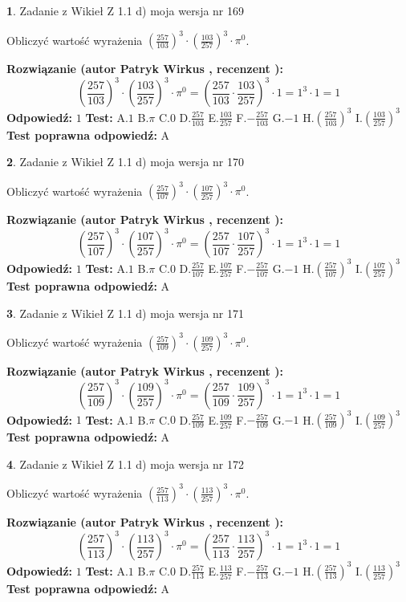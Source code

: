 \documentclass[12pt, a4paper]{article}
\theoremstyle{definition} %
\newtheorem{zad}{}
\newcommand{\zadStart}[1]{\begin{zad}#1\newline}
\newcommand{\zadStop}{\end{zad}}
\newcommand{\rozwStart}[2]{\noindent \textbf{Rozwiązanie (autor #1 , recenzent #2): }\newline}
\newcommand{\rozwStop}{\newline}
\newcommand{\odpStart}{\noindent \textbf{Odpowiedź:}\newline}
\newcommand{\odpStop}{\newline}
\newcommand{\testStart}{\noindent \textbf{Test:}\newline}
\newcommand{\testStop}{\newline}
\newcommand{\kluczStart}{\noindent \textbf{Test poprawna odpowiedź:}\newline}
\newcommand{\kluczStop}{\newline}
\begin{document}
\zadStart{Zadanie z Wikieł Z 1.1 d) moja wersja nr 169}

Obliczyć wartość wyrażenia $(\frac{257}{103})^{3} \cdot (\frac{103}{257})^{3} \cdot \pi^{0}$.
\zadStop
\rozwStart{Patryk Wirkus}{}
$$(\frac{257}{103})^{3} \cdot (\frac{103}{257})^{3} \cdot \pi^{0} = (\frac{257}{103} \cdot \frac{103}{257})^{3} \cdot 1 = 1^{3} \cdot 1 = 1$$
\rozwStop
\odpStart
$1$
\odpStop
\testStart
A.$1$ B.$\pi$ C.$0$ D.$\frac{257}{103}$ E.$\frac{103}{257}$
F.$-\frac{257}{103}$ G.$-1$
H.$(\frac{257}{103})^{3}$
I.$(\frac{103}{257})^{3}$
\testStop
\kluczStart
A
\kluczStop



\zadStart{Zadanie z Wikieł Z 1.1 d) moja wersja nr 170}

Obliczyć wartość wyrażenia $(\frac{257}{107})^{3} \cdot (\frac{107}{257})^{3} \cdot \pi^{0}$.
\zadStop
\rozwStart{Patryk Wirkus}{}
$$(\frac{257}{107})^{3} \cdot (\frac{107}{257})^{3} \cdot \pi^{0} = (\frac{257}{107} \cdot \frac{107}{257})^{3} \cdot 1 = 1^{3} \cdot 1 = 1$$
\rozwStop
\odpStart
$1$
\odpStop
\testStart
A.$1$ B.$\pi$ C.$0$ D.$\frac{257}{107}$ E.$\frac{107}{257}$
F.$-\frac{257}{107}$ G.$-1$
H.$(\frac{257}{107})^{3}$
I.$(\frac{107}{257})^{3}$
\testStop
\kluczStart
A
\kluczStop



\zadStart{Zadanie z Wikieł Z 1.1 d) moja wersja nr 171}

Obliczyć wartość wyrażenia $(\frac{257}{109})^{3} \cdot (\frac{109}{257})^{3} \cdot \pi^{0}$.
\zadStop
\rozwStart{Patryk Wirkus}{}
$$(\frac{257}{109})^{3} \cdot (\frac{109}{257})^{3} \cdot \pi^{0} = (\frac{257}{109} \cdot \frac{109}{257})^{3} \cdot 1 = 1^{3} \cdot 1 = 1$$
\rozwStop
\odpStart
$1$
\odpStop
\testStart
A.$1$ B.$\pi$ C.$0$ D.$\frac{257}{109}$ E.$\frac{109}{257}$
F.$-\frac{257}{109}$ G.$-1$
H.$(\frac{257}{109})^{3}$
I.$(\frac{109}{257})^{3}$
\testStop
\kluczStart
A
\kluczStop



\zadStart{Zadanie z Wikieł Z 1.1 d) moja wersja nr 172}

Obliczyć wartość wyrażenia $(\frac{257}{113})^{3} \cdot (\frac{113}{257})^{3} \cdot \pi^{0}$.
\zadStop
\rozwStart{Patryk Wirkus}{}
$$(\frac{257}{113})^{3} \cdot (\frac{113}{257})^{3} \cdot \pi^{0} = (\frac{257}{113} \cdot \frac{113}{257})^{3} \cdot 1 = 1^{3} \cdot 1 = 1$$
\rozwStop
\odpStart
$1$
\odpStop
\testStart
A.$1$ B.$\pi$ C.$0$ D.$\frac{257}{113}$ E.$\frac{113}{257}$
F.$-\frac{257}{113}$ G.$-1$
H.$(\frac{257}{113})^{3}$
I.$(\frac{113}{257})^{3}$
\testStop
\kluczStart
A
\kluczStop
\end{document}
